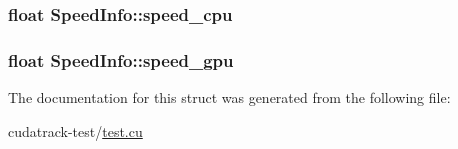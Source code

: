 \subsubsection[{\texorpdfstring{speed\+\_\+cpu}{speed_cpu}}]{\setlength{\rightskip}{0pt plus 5cm}float Speed\+Info\+::speed\+\_\+cpu}\hypertarget{struct_speed_info_a083482c754c5ab95f6f25238610f803c}{}\label{struct_speed_info_a083482c754c5ab95f6f25238610f803c}
\subsubsection[{\texorpdfstring{speed\+\_\+gpu}{speed_gpu}}]{\setlength{\rightskip}{0pt plus 5cm}float Speed\+Info\+::speed\+\_\+gpu}\hypertarget{struct_speed_info_aaa8f95513c3132d321801bfff20f11a4}{}\label{struct_speed_info_aaa8f95513c3132d321801bfff20f11a4}


The documentation for this struct was generated from the following file\+:\begin{DoxyCompactItemize}
\item 
cudatrack-\/test/\hyperlink{test_8cu}{test.\+cu}\end{DoxyCompactItemize}
